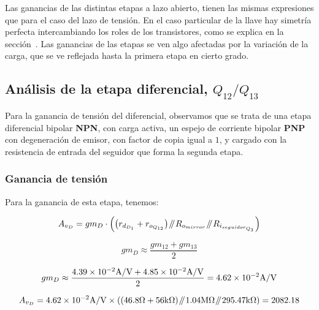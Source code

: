 \label{section:current_loop}


Las ganancias de las distintas etapas a lazo abierto, tienen las mismas expresiones que para el caso del lazo de tensión. En el caso particular de la llave hay simetría perfecta intercambiando los roles de los transistores, como se explica en la sección~. Las ganancias de las etapas se ven algo afectadas por la variación de la carga, que se ve reflejada hasta la primera etapa en cierto grado.

\subsection{Análisis de la etapa diferencial, $Q_{12}/Q_{13}$}

Para la ganancia de tensión del diferencial, observamos que se trata de una etapa diferencial bipolar \textbf{NPN}, con carga activa, un espejo de corriente bipolar \textbf{PNP} con degeneración de emisor, con factor de copia igual a $1$, y cargado con la resistencia de entrada del seguidor que forma la segunda etapa.\\


\subsubsection{Ganancia de tensión}

Para la ganancia de esta etapa, tenemos:

\begin{equation}
A_{v_{D}} = gm_{D} \cdot \left( \left(  r_{d_{D_{1}}} + r_{o_{Q_{12}}} \right) \parallelresistors  R_{o_{mirror}} \parallelresistors R_{i_{seguidor_{Q_{3}}}} \right)
\end{equation}


\begin{equation}
gm_{D} \approx \frac{gm_{12} + gm_{13}}{2}
\end{equation}


\begin{equation*}
gm_{D} \approx \frac{\num{4.39E-2} \si[per-mode=symbol]{\ampere\per\volt} + \num{4.85E-2} \si[per-mode=symbol]{\ampere\per\volt}}{2} = \num{4.62e-2} \si[per-mode=symbol]{\ampere\per\volt}
\end{equation*}


\begin{equation*}
A_{v_{D}} = \num{4.62e-2} \si[per-mode=symbol]{\ampere\per\volt} \times \left( \left( 46.8 \si[per-mode=symbol]{\ohm}  + 56 \si[per-mode=symbol]{\kilo\ohm} \right) \parallelresistors 1.04 \si[per-mode=symbol]{\mega\ohm} \parallelresistors 295.47 \si[per-mode=symbol]{\kilo\ohm}  \right) = 2082.18
\end{equation*}

